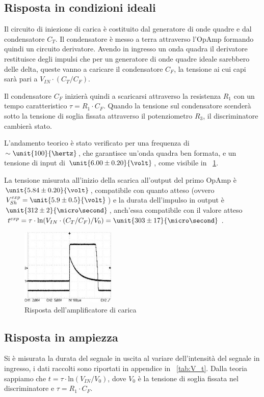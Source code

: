 \documentclass[10pt,a4paper]{article}
\begin{document}
\subsection{Risposta in condizioni ideali}
Il circuito di iniezione di carica è costituito dal generatore di onde quadre e dal condensatore $C_T$. Il condensatore è messo a terra attraverso l'OpAmp formando quindi un circuito derivatore. Avendo in ingresso un onda quadra il derivatore restituisce degli impulsi che per un generatore di onde quadre ideale sarebbero delle delta, queste vanno a caricare il condensatore $C_F$, la tensione ai cui capi sarà pari a $V_{IN}\cdot(C_T/C_F)$.

Il condensatore $C_F$ inizierà quindi a scaricarsi attraverso la resistenza $R_1$ con un tempo caratteristico $\tau = R_1 \cdot C_F$. Quando la tensione sul condensatore scenderà sotto la tensione di soglia fissata attraverso il potenziometro $R_3$, il discriminatore cambierà stato.

L'andamento teorico è stato verificato per una frequenza di $\sim \unit{100}{\hertz}$, che garantisce un'onda quadra ben formata, e un tensione di input di $\unit{6.00 \pm 0.20}{\volt}$, come visibile in \figurename{~\ref{ampli_carica}}. 

La tensione misurata all'inizio della scarica all'output del primo OpAmp è $\unit{5.84 \pm 0.20}{\volt}$, compatibile con quanto atteso (ovvero $V_{Sh}^{exp} = \unit{5.9 \pm 0.5}{\volt}$) e la durata dell'impulso in output è $\unit{312 \pm 2}{\micro\second}$, anch'essa compatibile con il valore atteso $t^{exp} = \tau \cdot \text{ln}(V_{IN}\cdot(C_T/C_F)/V_0) = \unit{303 \pm 17}{\micro\second}$.

\begin{figure}[H]
	\centering
	\includegraphics[width=0.40\textwidth]{../oscilloscopio/vsh_vdiscr.jpg}
	\caption{Risposta dell'amplificatore di carica}
	\label{ampli_carica}
\end{figure}

\subsection{Risposta in ampiezza}
Si è misurata la durata del segnale in uscita al variare dell'intensità del segnale in ingresso, i dati raccolti sono riportati in appendice in \tablename{~\ref{tab:V_t}}.
Dalla teoria sappiamo che $t = \tau \cdot \text{ln}(V_{IN}/V_0)$, dove $V_0$ è la tensione di soglia fissata nel discriminatore e $\tau = R_1 \cdot C_F$.
\end{document}
